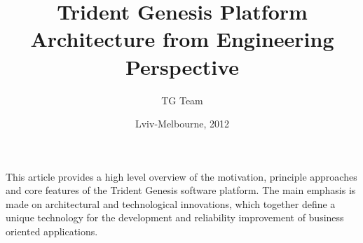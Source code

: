 \begin{titlepage}
\title{Trident Genesis Platform Architecture from Engineering Perspective}
\author{TG Team}
\date{Lviv-Melbourne, 2012}
\maketitle
\clearpage
  This article provides a high level overview of the motivation, principle approaches and core features of the Trident Genesis software platform.
  The main emphasis is made on architectural and technological innovations, which together define a unique technology for the development and reliability improvement of business oriented applications.

\clearpage
\tableofcontents
\clearpage

\end{titlepage}